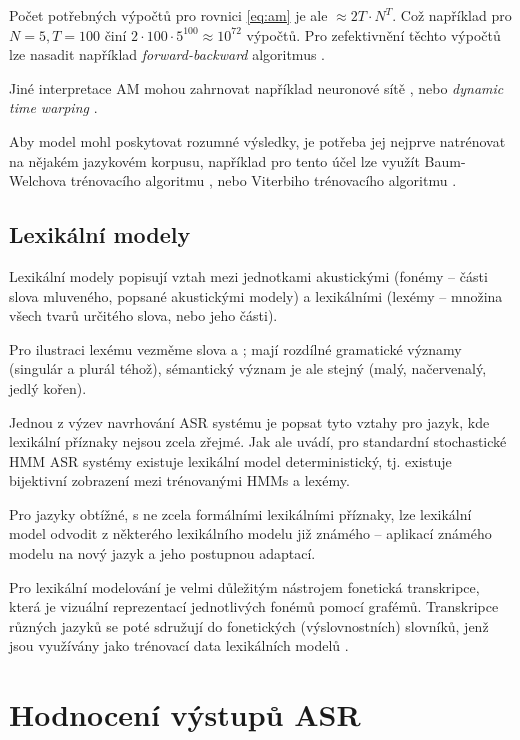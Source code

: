 Počet potřebných výpočtů pro rovnici \ref{eq:am} je ale $\approx 2T \cdot N^T$. Což například pro $N=5, T=100$ činí $2 \cdot 100 \cdot 5^{100} \approx 10^{72}$ výpočtů. Pro zefektivnění těchto výpočtů lze nasadit například {\sl forward-backward} algoritmus \cite{galindo_1995}.

Jiné interpretace AM mohou zahrnovat například neuronové sítě \cite{kingsbury_2009}, nebo {\sl dynamic time warping} \cite{tarar_2010}.

Aby model mohl poskytovat rozumné výsledky, je potřeba jej nejprve natrénovat na nějakém jazykovém korpusu, například pro tento účel lze využít Baum-Welchova trénovacího algoritmu \cite{han_2003}, nebo Viterbiho trénovacího algoritmu \cite{franzini_1990}.

\subsection{Lexikální modely}

Lexikální modely popisují vztah mezi jednotkami akustickými (fonémy -- části slova mluveného, popsané akustickými modely) a lexikálními (lexémy -- množina všech tvarů určitého slova, nebo jeho části). 

Pro ilustraci lexému vezměme slova  a ; mají rozdílné gramatické významy (singulár a plurál téhož), sémantický význam je ale stejný (malý, načervenalý, jedlý kořen). 

Jednou z výzev navrhování ASR systému je popsat tyto vztahy pro jazyk, kde lexikální příznaky nejsou zcela zřejmé. Jak ale \cite{rasipuram_2014} uvádí, pro standardní stochastické HMM ASR systémy existuje lexikální model deterministický, tj. existuje bijektivní zobrazení mezi trénovanými HMMs a lexémy.

Pro jazyky obtížné, s ne zcela formálními lexikálními příznaky, lze lexikální model odvodit z některého lexikálního modelu již známého -- aplikací známého modelu na nový jazyk a jeho postupnou adaptací.

Pro lexikální modelování je velmi důležitým nástrojem fonetická transkripce, která je vizuální reprezentací jednotlivých fonémů pomocí grafémů. Transkripce různých jazyků se poté sdružují do fonetických (výslovnostních) slovníků, jenž jsou využívány jako trénovací data lexikálních modelů \cite{haili_2013}. 

\section{Hodnocení výstupů ASR}

